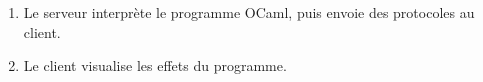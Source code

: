 \documentclass[14px]{article}
\begin{document}
\begin{enumerate}
\begin{figure}[htbp]
{\begin{minipage}[t]{0.4\linewidth}
			\end{minipage}%
		}%
		\centering
	\end{figure}
	\item Le serveur interprète le programme OCaml, puis envoie des protocoles au client.
	\item Le client visualise les effets du programme.
	\begin{figure}[htbp]
		\centering
\end{figure}
\end{enumerate}
\end{document}
